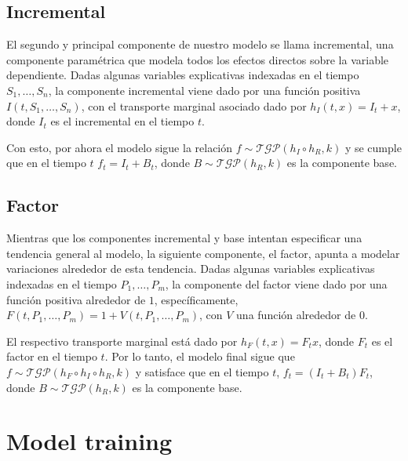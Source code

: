 \subsection{Incremental}

El segundo y principal componente de nuestro modelo se llama incremental, una componente paramétrica que modela todos los efectos directos sobre la variable dependiente. Dadas algunas variables explicativas indexadas en el tiempo \(S_1, \dotsc, S_n\), la componente incremental viene dado por una función positiva \(I(t, S_1, \dotsc, S_n)\), con el transporte marginal asociado dado por \(h_I(t, x) = I_t + x\), donde \(I_t\) es el incremental en el tiempo \(t\).

Con esto, por ahora el modelo sigue la relación \(f \sim \mathcal{TGP}(h_I \circ h_R, k)\) y se cumple que en el tiempo \(t\) \(f_t = I_t + B_t\), donde \(B \sim \mathcal{TGP}(h_R, k)\) es la componente base.

\subsection{Factor}

Mientras que los componentes incremental y base intentan especificar una tendencia general al modelo, la siguiente componente, el factor, apunta a modelar variaciones alrededor de esta tendencia. Dadas algunas variables explicativas indexadas en el tiempo \(P_1, \dotsc, P_m\), la componente del factor viene dado por una función positiva alrededor de \(1\), específicamente, \(F(t, P_1, \dotsc, P_m) = 1 + V(t, P_1, \dotsc, P_m)\), con \(V\) una función alrededor de \(0\).

El respectivo transporte marginal está dado por \(h_F(t, x) = F_t x\), donde \(F_t\) es el factor en el tiempo \(t\). Por lo tanto, el modelo final sigue que \(f \sim \mathcal{TGP}(h_F \circ h_I \circ h_R, k)\) y satisface que en el tiempo \(t\), \(f_t = (I_t + B_t) F_t\), donde \(B \sim \mathcal{TGP}(h_R, k)\) es la componente base.

\section{Model training}

